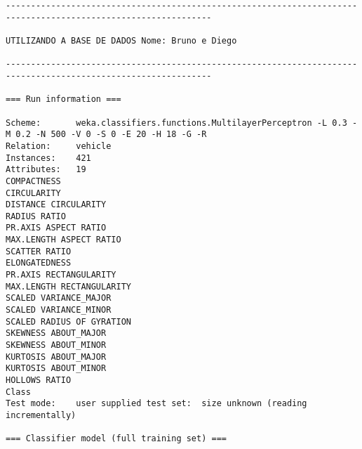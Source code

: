 \documentclass[
	article,			%
	11pt,				%
	oneside,			%
	a4paper,			%
	english,			%
	brazil,				%
	sumario=tradicional
	]{abntex2}
\begin{document}
\begin{lstlisting}
---------------------------------------------------------------------------------------------------------------

UTILIZANDO A BASE DE DADOS Nome: Bruno e Diego

---------------------------------------------------------------------------------------------------------------

=== Run information ===

Scheme:       weka.classifiers.functions.MultilayerPerceptron -L 0.3 -M 0.2 -N 500 -V 0 -S 0 -E 20 -H 18 -G -R
Relation:     vehicle
Instances:    421
Attributes:   19
COMPACTNESS
CIRCULARITY
DISTANCE CIRCULARITY
RADIUS RATIO
PR.AXIS ASPECT RATIO
MAX.LENGTH ASPECT RATIO
SCATTER RATIO
ELONGATEDNESS
PR.AXIS RECTANGULARITY
MAX.LENGTH RECTANGULARITY
SCALED VARIANCE_MAJOR
SCALED VARIANCE_MINOR
SCALED RADIUS OF GYRATION
SKEWNESS ABOUT_MAJOR
SKEWNESS ABOUT_MINOR
KURTOSIS ABOUT_MAJOR
KURTOSIS ABOUT_MINOR
HOLLOWS RATIO
Class
Test mode:    user supplied test set:  size unknown (reading incrementally)

=== Classifier model (full training set) ===


\end{lstlisting}
\end{document}
